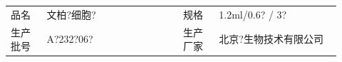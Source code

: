 \documentclass[UTF8,10pt,a4paper,fontset=fandol]{ctexart}
\newcommand{\fieldvalue}[1]{#1}
\newcommand{\handwritten}[1]{#1}
\begin{document}
\noindent
\begin{tabular}{p{0.10\linewidth}p{0.38\linewidth}p{0.10\linewidth}p{0.34\linewidth}}
品名 &
\fieldvalue{\handwritten{文柏?细胞?}} &
规格 &
\fieldvalue{\handwritten{1.2ml/0.6? / 3?}} \\
生产批号 &
\fieldvalue{\handwritten{A?232?06?}} &
生产厂家 &
\fieldvalue{\handwritten{北京?生物技术有限公司}}
\end{tabular}

\vspace{2mm}
\end{document}
